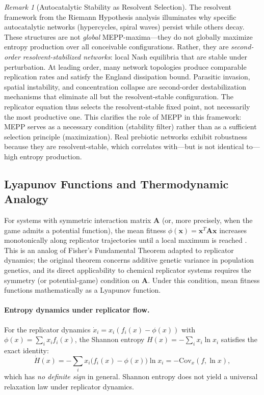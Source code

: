 \documentclass[12pt,a4paper]{article}
\theoremstyle{remark}
\newtheorem{remark}{Remark}
\begin{document}
\begin{remark}[Autocatalytic Stability as Resolvent Selection]
\label{rem:autocatalysis-resolvent}
The resolvent framework from the Riemann Hypothesis analysis \citep{GeigerRH2026b} illuminates why specific autocatalytic networks (hypercycles, spiral waves) persist while others decay. These structures are not \emph{global} MEPP-maxima---they do not globally maximize entropy production over all conceivable configurations. Rather, they are \emph{second-order resolvent-stabilized networks}: local Nash equilibria that are stable under perturbation. At leading order, many network topologies produce comparable replication rates and satisfy the England dissipation bound. Parasitic invasion, spatial instability, and concentration collapse are second-order destabilization mechanisms that eliminate all but the resolvent-stable configuration. The replicator equation thus selects the resolvent-stable fixed point, not necessarily the most productive one. This clarifies the role of MEPP in this framework: MEPP serves as a necessary condition (stability filter) rather than as a sufficient selection principle (maximization). Real prebiotic networks exhibit robustness because they are resolvent-stable, which correlates with---but is not identical to---high entropy production.
\end{remark}

\subsection{Lyapunov Functions and Thermodynamic Analogy}

For systems with symmetric interaction matrix $\mathbf{A}$ (or, more precisely, when the game admits a potential function), the mean fitness $\phi(\mathbf{x}) = \mathbf{x}^T \mathbf{A} \mathbf{x}$ increases monotonically along replicator trajectories until a local maximum is reached \citep{ReplicatorEntropy}. This is an analog of Fisher's Fundamental Theorem adapted to replicator dynamics; the original theorem concerns additive genetic variance in population genetics, and its direct applicability to chemical replicator systems requires the symmetry (or potential-game) condition on $\mathbf{A}$. Under this condition, mean fitness functions mathematically as a Lyapunov function.

\paragraph{Entropy dynamics under replicator flow.}
For the replicator dynamics $\dot{x}_i = x_i(f_i(x) - \phi(x))$ with $\phi(x) = \sum_i x_i f_i(x)$, the Shannon entropy $H(x) = -\sum_i x_i \ln x_i$ satisfies the exact identity:
\begin{equation}
\dot{H}(x) = -\sum_i x_i \big(f_i(x) - \phi(x)\big) \ln x_i = -\mathrm{Cov}_x(f, \ln x),
\end{equation}
which has \emph{no definite sign} in general. Shannon entropy does not yield a universal relaxation law under replicator dynamics.
\end{document}
